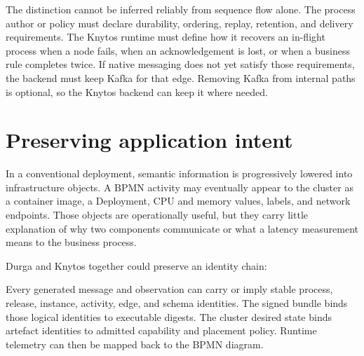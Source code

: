 The distinction cannot be inferred reliably from sequence flow alone. The
process author or policy must declare durability, ordering, replay, retention,
and delivery requirements. The Knytos runtime must define how it recovers an
in-flight process when a node fails, when an acknowledgement is lost, or when a
business rule completes twice. If native messaging does not yet satisfy those
requirements, the backend must keep Kafka for that edge. Removing Kafka from
internal paths is optional, so the Knytos backend can keep it where needed.

\section{Preserving application intent}

In a conventional deployment, semantic information is progressively lowered
into infrastructure objects. A BPMN activity may eventually appear to the
cluster as a container image, a Deployment, CPU and memory values, labels, and
network endpoints. Those objects are operationally useful, but they carry
little explanation of why two components communicate or what a latency
measurement means to the business process.

Durga and Knytos together could preserve an identity chain:

\begin{center}
\end{center}

Every generated message and observation can carry or imply stable process,
release, instance, activity, edge, and schema identities. The signed bundle
binds those logical identities to executable digests. The cluster desired state
binds artefact identities to admitted capability and placement policy. Runtime
telemetry can then be mapped back to the BPMN diagram.

